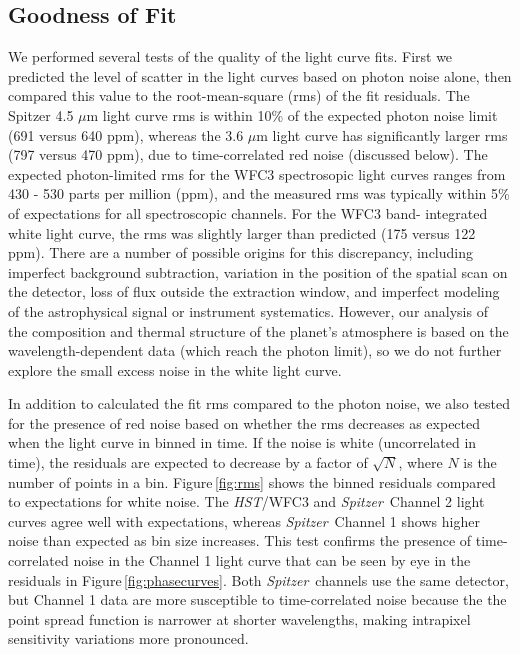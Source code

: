 \documentclass[twocolumn]{aastex61}
\newcommand{\project}[1]{\textsl{#1}}
\newcommand{\HST}{\project{HST}}
\newcommand{\Spitzer}{\project{Spitzer}}
\begin{document}
\subsection{Goodness of Fit}
\label{sec:fitquality}
We performed several tests of the quality of the light curve fits.  First we predicted the level of scatter in the light curves based on photon noise alone, then compared this value to the root-mean-square (rms) of the fit residuals.  The Spitzer 4.5 $\mu$m light curve rms is within 10\% of the expected photon noise limit (691 versus 640 ppm), whereas the 3.6 $\mu$m light curve has significantly larger rms (797 versus 470 ppm), due to time-correlated red noise (discussed below). The expected photon-limited rms for the WFC3 spectrosopic light curves ranges from 430 - 530 parts per million (ppm), and the measured rms was typically within 5\% of expectations for all spectroscopic channels.  For the WFC3 band- integrated white light curve, the rms was slightly larger than predicted (175 versus 122 ppm). There are a number of possible origins for this discrepancy, including imperfect background subtraction, variation in the position of the spatial scan on the detector, loss of flux outside the extraction window, and imperfect modeling of the astrophysical signal or instrument systematics. However, our analysis of the composition and thermal structure of the planet's atmosphere is based on the wavelength-dependent data (which reach the photon limit), so we do not further explore the small excess noise in the white light curve. 


In addition to calculated the fit rms compared to the photon noise, we also tested for the presence of red noise based on whether the rms decreases as expected when the light curve in binned in time.  If the noise is white (uncorrelated in time), the residuals are expected to decrease by a factor of $\sqrt{N}$, where $N$ is the number of points in a bin. Figure\,\ref{fig:rms} shows the binned residuals compared to expectations for white noise. The \HST/WFC3 and \Spitzer\ Channel 2 light curves agree well with expectations, whereas \Spitzer\ Channel 1 shows higher noise than expected as bin size increases. This test confirms the presence of time-correlated noise in the Channel 1 light curve that can be seen by eye in the residuals in Figure\,\ref{fig:phasecurves}. Both \Spitzer\ channels use the same detector, but Channel 1 data are more susceptible to time-correlated noise because the the point spread function is narrower at shorter wavelengths, making intrapixel sensitivity variations more pronounced.
\end{document}
